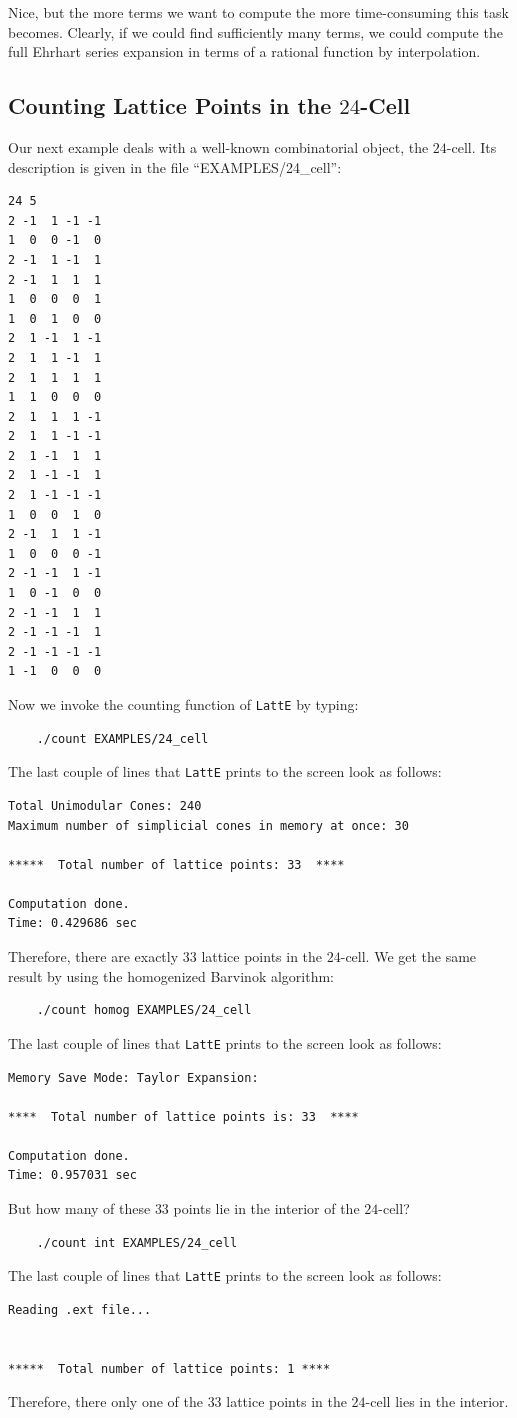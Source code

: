 \documentclass{article}
\begin{document}
Nice, but the more terms we want to compute the more time-consuming
this task becomes. Clearly, if we could find sufficiently many
terms, we could compute the full Ehrhart series expansion in terms of
a rational function by interpolation.

\subsection{Counting Lattice Points in the $24$-Cell}
Our next example deals with a well-known combinatorial object, the
$24$-cell. Its description is given in the file ``EXAMPLES/24\_cell'':
\begin{verbatim}
24 5 
2 -1  1 -1 -1
1  0  0 -1  0
2 -1  1 -1  1
2 -1  1  1  1
1  0  0  0  1
1  0  1  0  0
2  1 -1  1 -1
2  1  1 -1  1
2  1  1  1  1
1  1  0  0  0
2  1  1  1 -1
2  1  1 -1 -1
2  1 -1  1  1
2  1 -1 -1  1
2  1 -1 -1 -1
1  0  0  1  0
2 -1  1  1 -1
1  0  0  0 -1
2 -1 -1  1 -1
1  0 -1  0  0
2 -1 -1  1  1
2 -1 -1 -1  1
2 -1 -1 -1 -1
1 -1  0  0  0
\end{verbatim}
Now we invoke the counting function of {\tt LattE} by typing:
\begin{verbatim}
    ./count EXAMPLES/24_cell
\end{verbatim}
The last couple of lines that {\tt LattE} prints to the screen
look as follows:
\begin{verbatim}
Total Unimodular Cones: 240
Maximum number of simplicial cones in memory at once: 30

*****  Total number of lattice points: 33  ****

Computation done. 
Time: 0.429686 sec
\end{verbatim}
Therefore, there are exactly $33$ lattice points in the $24$-cell. We
get the same result by using the homogenized Barvinok algorithm:
\begin{verbatim}
    ./count homog EXAMPLES/24_cell
\end{verbatim}
The last couple of lines that {\tt LattE} prints to the screen
look as follows:
\begin{verbatim}
Memory Save Mode: Taylor Expansion:

****  Total number of lattice points is: 33  ****

Computation done. 
Time: 0.957031 sec
\end{verbatim}
But how many of these $33$ points lie in the interior of the
$24$-cell?
\begin{verbatim}
    ./count int EXAMPLES/24_cell
\end{verbatim}
The last couple of lines that {\tt LattE} prints to the screen
look as follows:
\begin{verbatim}
Reading .ext file...


*****  Total number of lattice points: 1 ****
\end{verbatim}
Therefore, there only one of the $33$ lattice points in the $24$-cell
lies in the interior.
\end{document}
